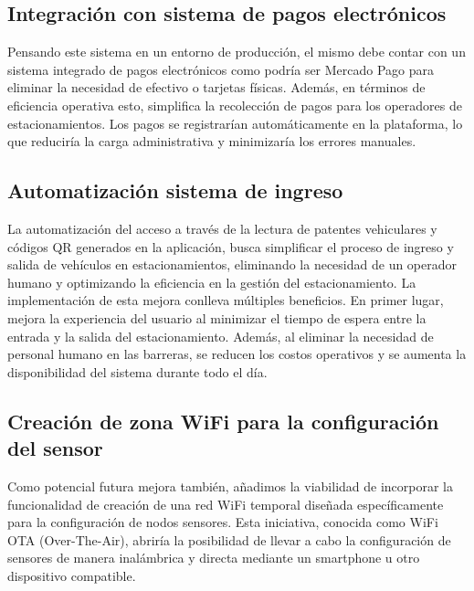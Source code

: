 
\subsection{Integración con sistema de pagos electrónicos}

Pensando este sistema en un entorno de producción, el mismo debe contar con un sistema integrado de pagos electrónicos como podría ser Mercado Pago para eliminar la necesidad de efectivo o tarjetas físicas. Además, en términos de eficiencia operativa esto, simplifica la recolección de pagos para los operadores de estacionamientos. Los pagos se registrarían automáticamente en la plataforma, lo que reduciría la carga administrativa y minimizaría los errores manuales.

\subsection{Automatización sistema de ingreso}{\label{automatizacion_ingreso}}
La automatización del acceso a través de la lectura de patentes vehiculares y códigos QR generados en la aplicación, busca simplificar el proceso de ingreso y salida de vehículos en estacionamientos, eliminando la necesidad de un operador humano y optimizando la eficiencia en la gestión del estacionamiento. La implementación de esta mejora conlleva múltiples beneficios. En primer lugar, mejora la experiencia del usuario al minimizar el tiempo de espera entre la entrada y la salida del estacionamiento. Además, al eliminar la necesidad de personal humano en las barreras, se reducen los costos operativos y se aumenta la disponibilidad del sistema durante todo el día.

\subsection{Creación de zona WiFi para la configuración del sensor}{\label{potencial_mejora_wifiOTA}}
Como potencial futura mejora también, añadimos la viabilidad de incorporar la funcionalidad de creación de una red WiFi temporal
diseñada específicamente para la configuración de nodos sensores. Esta iniciativa, conocida como WiFi OTA (Over-The-Air),
abriría la posibilidad de llevar a cabo la configuración de sensores de manera inalámbrica y directa mediante un smartphone u otro dispositivo compatible.

